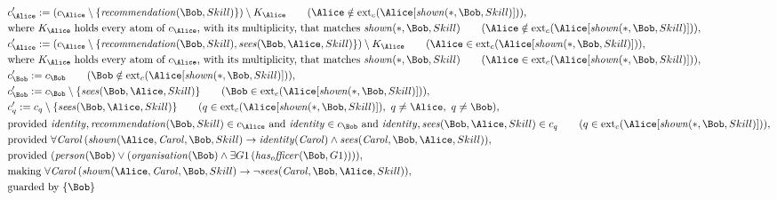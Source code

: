 \begin{align*}
&
c'_
{
\Alice
}
 := 
(c_
{
\Alice
}
 \setminus 
\{
\mathit{
recommendation
}
(
\Bob
,
Skill
)
\}
) \setminus K_
{
\Alice
}
 \qquad (
\Alice
 \notin 
\mathrm{ext}_c(
\Alice
[
\mathit{
shown
}
(
\ast
,
\Bob
,
Skill
)
]
)
)
,\\
&
\text{where } K_
{
\Alice
}
 \text{ holds every atom of } c_
{
\Alice
}
 \text{, with its multiplicity, that matches } 
\mathit{
shown
}
(
\ast
,
\Bob
,
Skill
)
 \qquad (
\Alice
 \notin 
\mathrm{ext}_c(
\Alice
[
\mathit{
shown
}
(
\ast
,
\Bob
,
Skill
)
]
)
)
,\\
&
c'_
{
\Alice
}
 := 
(c_
{
\Alice
}
 \setminus 
\{
\mathit{
recommendation
}
(
\Bob
,
Skill
)
,
\mathit{
sees
}
(
\Bob
,
\Alice
,
Skill
)
\}
) \setminus K_
{
\Alice
}
 \qquad (
\Alice
 \in 
\mathrm{ext}_c(
\Alice
[
\mathit{
shown
}
(
\ast
,
\Bob
,
Skill
)
]
)
)
,\\
&
\text{where } K_
{
\Alice
}
 \text{ holds every atom of } c_
{
\Alice
}
 \text{, with its multiplicity, that matches } 
\mathit{
shown
}
(
\ast
,
\Bob
,
Skill
)
 \qquad (
\Alice
 \in 
\mathrm{ext}_c(
\Alice
[
\mathit{
shown
}
(
\ast
,
\Bob
,
Skill
)
]
)
)
,\\
&
c'_
{
\Bob
}
 := 
c_
{
\Bob
}
 \qquad (
\Bob
 \notin 
\mathrm{ext}_c(
\Alice
[
\mathit{
shown
}
(
\ast
,
\Bob
,
Skill
)
]
)
)
,\\
&
c'_
{
\Bob
}
 := 
c_
{
\Bob
}
 \setminus 
\{
\mathit{
sees
}
(
\Bob
,
\Alice
,
Skill
)
\}
 \qquad (
\Bob
 \in 
\mathrm{ext}_c(
\Alice
[
\mathit{
shown
}
(
\ast
,
\Bob
,
Skill
)
]
)
)
,\\
&
c'_
q
 := 
c_
q
 \setminus 
\{
\mathit{
sees
}
(
\Bob
,
\Alice
,
Skill
)
\}
 \qquad (
q
 \in 
\mathrm{ext}_c(
\Alice
[
\mathit{
shown
}
(
\ast
,
\Bob
,
Skill
)
]
)
,\ 
q \neq 
\Alice
,\ 
q \neq 
\Bob
)
,\\
&
\text{provided } 
\mathit{
identity
}
,
\mathit{
recommendation
}
(
\Bob
,
Skill
)
 \in c_
{
\Alice
}
 \text{ and } 
\mathit{
identity
}
 \in c_
{
\Bob
}
 \text{ and } 
\mathit{
identity
}
,
\mathit{
sees
}
(
\Bob
,
\Alice
,
Skill
)
 \in c_
q
 \qquad (
q \in 
\mathrm{ext}_c(
\Alice
[
\mathit{
shown
}
(
\ast
,
\Bob
,
Skill
)
]
)
)
,\\
&
\text{provided } 
\forall 
\mathit{Carol}
\,(
\mathit{
shown
}
(
\Alice
,
\mathit{Carol}
,
\Bob
,
Skill
)
\rightarrow
\mathit{
identity
}
(
\mathit{Carol}
)
\land
\mathit{
sees
}
(
\mathit{Carol}
,
\Bob
,
\Alice
,
Skill
)
)
,\\
&
\text{provided } 
(
\mathit{
person
}
(
\Bob
)
\lor
(
\mathit{
organisation
}
(
\Bob
)
\land
\exists 
G1
\,(
\mathit{
has_officer
}
(
\Bob
,
G1
)
)
)
)
,\\
&
\text{making } 
\forall 
\mathit{Carol}
\,(
\mathit{
shown
}
(
\Alice
,
\mathit{Carol}
,
\Bob
,
Skill
)
\rightarrow
\neg 
\mathit{
sees
}
(
\mathit{Carol}
,
\Bob
,
\Alice
,
Skill
)
)
,\\
&
\text{guarded by } \{
\Bob
\}
\end{align*}
